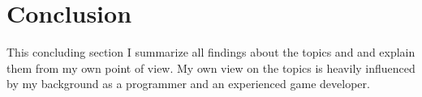 \chapter{Conclusion}

This concluding section I summarize all findings about the topics \mss{} and
\ogs{} and explain them from my own point of view. My own view on the topics
is heavily influenced by my background as a programmer and an experienced game
developer.








